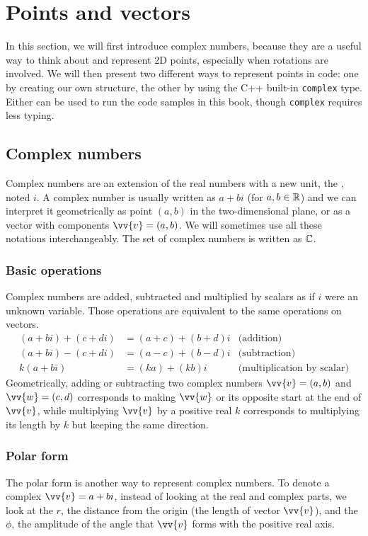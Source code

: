 \section{Points and vectors}

In this section, we will first introduce complex numbers, because they are a useful way to think about and represent 2D points, especially when rotations are involved. We will then present two different ways to represent points in code: one by creating our own structure, the other by using the C++ built-in \lstinline|complex| type. Either can be used to run the code samples in this book, though \lstinline|complex| requires less typing.

\subsection{Complex numbers}\label{complex}
Complex numbers are an extension of the real numbers with a new unit, the , noted $i$. A complex number is usually written as $a + bi$ (for $a,b \in\mathbb{R}$) and we can interpret it geometrically as point $(a,b)$ in the two-dimensional plane, or as a vector with components $\vv{v}=(a,b)$. We will sometimes use all these notations interchangeably. The set of complex numbers is written as $\mathbb{C}$.


\subsubsection{Basic operations}
Complex numbers are added, subtracted and multiplied by scalars as if $i$ were an unknown variable. Those operations are equivalent to the same operations on vectors.
\begin{align*}
(a+bi) + (c+di) &= (a+c) + (b+d)i &\mbox{(addition)} \\
(a+bi) - (c+di) &= (a-c) + (b-d)i &\mbox{(subtraction)} \\
k(a+bi) &= (ka) + (kb)i &\mbox{(multiplication by scalar)}
\end{align*}
Geometrically, adding or subtracting two complex numbers $\vv{v}=(a,b)$ and $\vv{w}=(c,d)$ corresponds to making $\vv{w}$ or its opposite start at the end of $\vv{v}$, while multiplying $\vv{v}$ by a positive real $k$ corresponds to multiplying its length by $k$ but keeping the same direction.


\subsubsection{Polar form}\label{polar-form}
The polar form is another way to represent complex numbers. To denote a complex $\vv{v} = a+bi$, instead of looking at the real and complex parts, we look at the  $r$, the distance from the origin (the length of vector $\vv{v}$), and the  $\phi$, the amplitude of the angle that $\vv{v}$ forms with the positive real axis.


